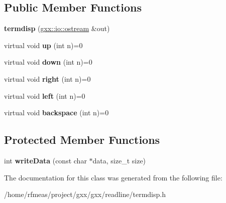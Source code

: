 \subsection*{Public Member Functions}
\begin{DoxyCompactItemize}
\item 
{\bfseries termdisp} (\hyperlink{classgxx_1_1io_1_1ostream}{gxx\+::io\+::ostream} \&out)\hypertarget{classgxx_1_1termdisp_aa0ce79b2a396c64583d7b50b79e05d2a}{}\label{classgxx_1_1termdisp_aa0ce79b2a396c64583d7b50b79e05d2a}

\item 
virtual void {\bfseries up} (int n)=0\hypertarget{classgxx_1_1termdisp_a27238c4b3b1d9bf12a3d859a389ae7ff}{}\label{classgxx_1_1termdisp_a27238c4b3b1d9bf12a3d859a389ae7ff}

\item 
virtual void {\bfseries down} (int n)=0\hypertarget{classgxx_1_1termdisp_aa1d4fccd0d493e1df0f1b6bd151ccd08}{}\label{classgxx_1_1termdisp_aa1d4fccd0d493e1df0f1b6bd151ccd08}

\item 
virtual void {\bfseries right} (int n)=0\hypertarget{classgxx_1_1termdisp_a68c782a16fdb3fe85818229dd4f8deba}{}\label{classgxx_1_1termdisp_a68c782a16fdb3fe85818229dd4f8deba}

\item 
virtual void {\bfseries left} (int n)=0\hypertarget{classgxx_1_1termdisp_ac66aafb35de9e8e7661d4dd607b025f4}{}\label{classgxx_1_1termdisp_ac66aafb35de9e8e7661d4dd607b025f4}

\item 
virtual void {\bfseries backspace} (int n)=0\hypertarget{classgxx_1_1termdisp_a5507ce22bffa0cea34f57575f97adc0b}{}\label{classgxx_1_1termdisp_a5507ce22bffa0cea34f57575f97adc0b}

\end{DoxyCompactItemize}
\subsection*{Protected Member Functions}
\begin{DoxyCompactItemize}
\item 
int {\bfseries write\+Data} (const char $\ast$data, size\+\_\+t size)\hypertarget{classgxx_1_1termdisp_a3ececc0539ea8d5d3f916563dc967317}{}\label{classgxx_1_1termdisp_a3ececc0539ea8d5d3f916563dc967317}

\end{DoxyCompactItemize}


The documentation for this class was generated from the following file\+:\begin{DoxyCompactItemize}
\item 
/home/rfmeas/project/gxx/gxx/readline/termdisp.\+h\end{DoxyCompactItemize}
